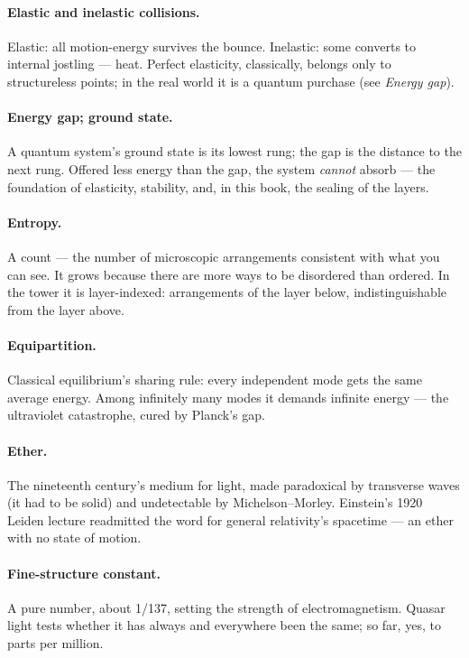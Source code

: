 \documentclass[fontsize=11pt,paper=a4,pagesize=auto,parskip=half-]{scrbook}
\begin{document}
\paragraph{Elastic and inelastic collisions.} Elastic: all motion-energy survives the bounce. Inelastic: some converts to internal jostling --- heat. Perfect elasticity, classically, belongs only to structureless points; in the real world it is a quantum purchase (see \emph{Energy gap}).

\paragraph{Energy gap; ground state.} A quantum system's ground state is its lowest rung; the gap is the distance to the next rung. Offered less energy than the gap, the system \emph{cannot} absorb --- the foundation of elasticity, stability, and, in this book, the sealing of the layers.

\paragraph{Entropy.} A count --- the number of microscopic arrangements consistent with what you can see. It grows because there are more ways to be disordered than ordered. In the tower it is layer-indexed: arrangements of the layer below, indistinguishable from the layer above.

\paragraph{Equipartition.} Classical equilibrium's sharing rule: every independent mode gets the same average energy. Among infinitely many modes it demands infinite energy --- the ultraviolet catastrophe, cured by Planck's gap.

\paragraph{Ether.} The nineteenth century's medium for light, made paradoxical by transverse waves (it had to be solid) and undetectable by Michelson--Morley. Einstein's 1920 Leiden lecture readmitted the word for general relativity's spacetime --- an ether with no state of motion.

\paragraph{Fine-structure constant.} A pure number, about 1/137, setting the strength of electromagnetism. Quasar light tests whether it has always and everywhere been the same; so far, yes, to parts per million.
\end{document}
